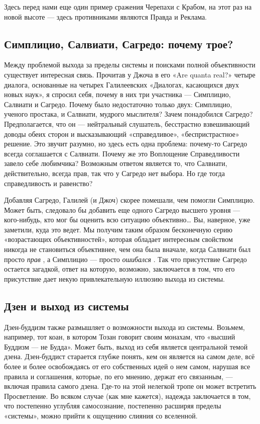 \documentclass[../main.tex]{subfiles}
\begin{document}
Здесь перед нами еще один пример сражения Черепахи с Крабом, на этот раз на новой высоте --- здесь противниками являются Правда и Реклама.


\subsection{Симплицио, Салвиати, Сагредо: почему трое?}

Между проблемой выхода за пределы системы и поисками полной объективности существует интересная связь. Прочитав у Джоча в его «Are quanta real?» четыре диалога, основанные на четырех Галилеевских «Диалогах, касающихся двух новых наук», я спросил себя, почему в них три участника --- Симплицио, Салвиати и Сагредо. Почему было недостаточно только двух: Симплицио, ученого простака, и Салвиати, мудрого мыслителя? Зачем понадобился Сагредо? Предполагается, что он --- нейтральный слушатель, бесстрастно взвешивающий доводы обеих сторон и высказывающий «справедливое», «беспристрастное» решение. Это звучит разумно, но здесь есть одна проблема: почему-то Сагредо всегда соглашается с Салвиати. Почему же это Воплощение Справедливости завело себе любимчика? Возможным ответом является то, что Салвиати, действительно, всегда прав, так что у Сагредо нет выбора. Но где тогда справедливость и равенство?

Добавляя Сагредо, Галилей (и Джоч) скорее помешали, чем помогли Симплицио. Может быть, следовало бы добавить еще одного Сагредо высшего уровня --- кого-нибудь, кто мог бы оценить всю ситуацию объективно\ldots{} Вы, наверное, уже заметили, куда это ведет. Мы получим таким образом бесконечную серию «возрастающих объективностей», которая обладает интересным свойством никогда не становиться объективнее, чем она была вначале, когда Салвиати был просто \emph{прав} , а Симплицио --- просто \emph{ошибался} . Так что присутствие Сагредо остается загадкой, ответ на которую, возможно, заключается в том, что его присутствие дает некую привлекательную иллюзию выхода из системы.


\subsection{Дзен и выход из системы}

Дзен-буддизм также размышляет о возможности выхода из системы. Возьмем, например, тот коан, в котором Тозан говорит своим монахам, что «высший Буддизм --- не Будда». Может быть, выход из себя является центральной темой дзена. Дзен-буддист старается глубже понять, кем он является на самом деле, всё более и более освобождаясь от его собственных идей о нем самом, нарушая все правила и соглашения, которые, по его мнению, держат его связанным, --- включая правила самого дзена. Где-то на этой нелегкой тропе он может встретить Просветление. Во всяком случае (как мне кажется), надежда заключается в том, что постепенно углубляя самосознание, постепенно расширяя пределы «системы», можно прийти к ощущению слияния со вселенной.
\end{document}
